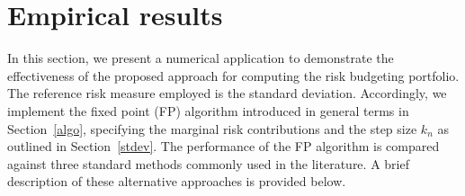 \documentclass[preprint,11pt,authoryear]{elsarticle}
\begin{document}
\section{Empirical results}\label{num}

In this section, we present a numerical application to demonstrate the effectiveness of the proposed approach for computing the risk budgeting portfolio. The reference risk measure employed is the standard deviation. Accordingly, we implement the fixed point (FP) algorithm introduced in general terms in Section~\ref{algo}, specifying the marginal risk contributions and the step size $k_n$ as outlined in Section~\ref{stdev}. The performance of the FP algorithm is compared against three standard methods commonly used in the literature. A brief description of these alternative approaches is provided below.
\end{document}
